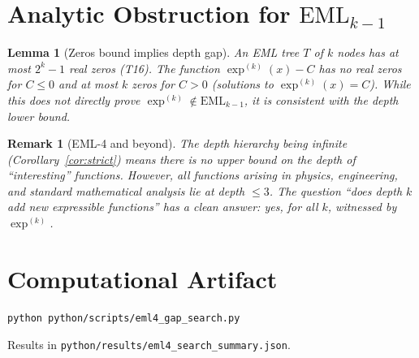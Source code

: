 \documentclass[11pt]{article}
\newtheorem{lemma}[theorem]{Lemma}
\newtheorem{remark}{Remark}
\begin{document}
\section{Analytic Obstruction for $\mathrm{EML}_{k-1}$}

\begin{lemma}[Zeros bound implies depth gap]
An EML tree $T$ of $k$ nodes has at most $2^k - 1$ real zeros (T16).  The
function $\exp^{(k)}(x) - C$ has no real zeros for $C \leq 0$ and at most
$k$ zeros for $C > 0$ (solutions to $\exp^{(k)}(x) = C$).  While this does
not directly prove $\exp^{(k)} \notin \mathrm{EML}_{k-1}$, it is consistent
with the depth lower bound.
\end{lemma}

\begin{remark}[EML-4 and beyond]
The depth hierarchy being infinite (Corollary~\ref{cor:strict}) means there is
no upper bound on the depth of ``interesting'' functions.  However, all functions
arising in physics, engineering, and standard mathematical analysis lie at depth
$\leq 3$.  The question ``does depth $k$ add new expressible functions'' has a
clean answer: yes, for all $k$, witnessed by $\exp^{(k)}$.
\end{remark}

\section*{Computational Artifact}
\begin{verbatim}
python python/scripts/eml4_gap_search.py
\end{verbatim}
Results in \texttt{python/results/eml4\_search\_summary.json}.
\end{document}
